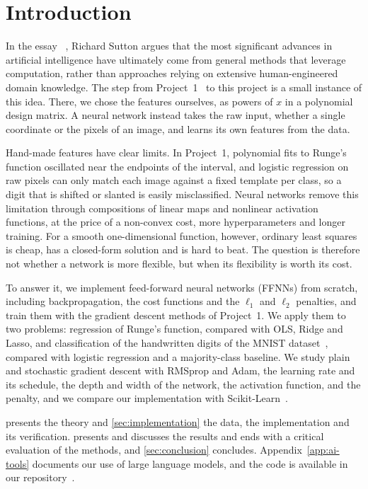 \section{Introduction}\label{sec:introduction}

%

In the essay ~\cite{sutton_2019}, Richard Sutton
argues that the most significant advances in artificial intelligence
have ultimately come from general methods that leverage computation,
rather than approaches relying on extensive human-engineered domain
knowledge. The step from Project~1~\cite{riseth_2026} to this project
is a small instance of this idea. There, we chose the features ourselves,
as powers of $x$ in a polynomial design matrix. A neural network instead
takes the raw input, whether a single coordinate or the pixels of an
image, and learns its own features from the data.

Hand-made features have clear limits. In Project~1, polynomial fits to
Runge's function oscillated near the endpoints of the interval, and
logistic regression on raw pixels can only match each image against a
fixed template per class, so a digit that is shifted or slanted is easily
misclassified. Neural networks remove this limitation through
compositions of linear maps and nonlinear activation functions, at the
price of a non-convex cost, more hyperparameters and longer training.
For a smooth one-dimensional function, however, ordinary least squares
is cheap, has a closed-form solution and is hard to beat. The question
is therefore not whether a network is more flexible, but when its
flexibility is worth its cost.

To answer it, we implement feed-forward neural networks (FFNNs) from
scratch, including backpropagation, the cost functions and the $\ell_1$
and $\ell_2$ penalties, and train them with the gradient descent methods
of Project~1. We apply them to two problems: regression of Runge's
function, compared with OLS, Ridge and Lasso, and classification of the
handwritten digits of the MNIST dataset~\cite{lecun_2010}, compared with
logistic regression and a majority-class baseline. We study plain and
stochastic gradient descent with RMSprop and Adam, the learning rate and
its schedule, the depth and width of the network, the activation
function, and the penalty, and we compare our implementation with
Scikit-Learn~\cite{pedregosa_2011}.

 presents the theory and \cref{sec:implementation} the
data, the implementation and its verification.
 presents and discusses the results and
ends with a critical evaluation of the methods, and \cref{sec:conclusion} concludes.
Appendix~\ref{app:ai-tools} documents our use of large language models,
and the code is available in our repository~\cite{riseth_2026a}.

